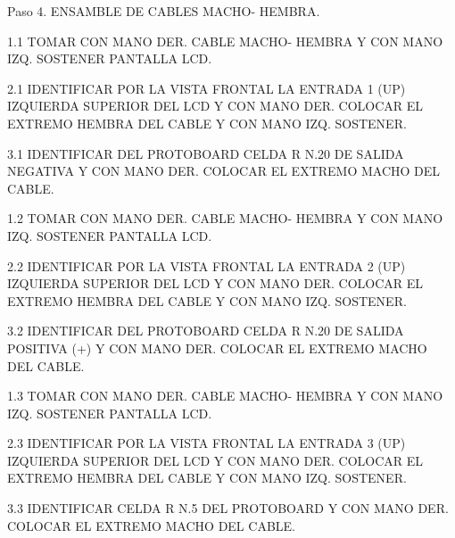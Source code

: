 Paso 4. ENSAMBLE DE CABLES MACHO- HEMBRA.

1.1  TOMAR CON MANO DER. CABLE MACHO- HEMBRA Y CON MANO IZQ. SOSTENER PANTALLA LCD.





2.1  IDENTIFICAR POR LA VISTA FRONTAL LA ENTRADA 1 (UP)  IZQUIERDA SUPERIOR DEL LCD Y CON MANO DER. COLOCAR EL EXTREMO HEMBRA DEL CABLE Y CON MANO IZQ. SOSTENER.







3.1   IDENTIFICAR DEL PROTOBOARD CELDA R N.20 DE SALIDA NEGATIVA Y CON MANO DER. COLOCAR EL EXTREMO MACHO DEL CABLE.









1.2  TOMAR CON MANO DER. CABLE MACHO- HEMBRA Y CON MANO IZQ. SOSTENER PANTALLA LCD.





2.2  IDENTIFICAR POR LA VISTA FRONTAL LA ENTRADA 2 (UP)  IZQUIERDA SUPERIOR DEL LCD Y CON MANO DER. COLOCAR EL EXTREMO HEMBRA DEL CABLE Y CON MANO IZQ. SOSTENER.







3.2   IDENTIFICAR DEL PROTOBOARD CELDA R N.20 DE SALIDA POSITIVA (+) Y CON MANO DER. COLOCAR EL EXTREMO MACHO DEL CABLE.











1.3  TOMAR CON MANO DER. CABLE MACHO- HEMBRA Y CON MANO IZQ. SOSTENER PANTALLA LCD.





2.3  IDENTIFICAR POR LA VISTA FRONTAL LA ENTRADA 3 (UP)  IZQUIERDA SUPERIOR DEL LCD Y CON MANO DER. COLOCAR EL EXTREMO HEMBRA DEL CABLE Y CON MANO IZQ. SOSTENER.





 
3.3 IDENTIFICAR CELDA R N.5 DEL PROTOBOARD Y CON MANO DER. COLOCAR EL EXTREMO MACHO DEL CABLE.












